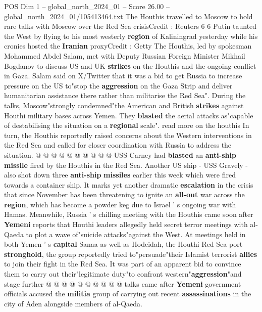 \begin{textsample}{POS Dim 1 – global\_north\_2024\_01 – Score 26.00 – global\_north\_2024\_01/105413464.txt}  \label{ex:f1_pos_129}
The Houthis travelled to Moscow to hold rare talks with Moscow over the Red Sea crisisCredit : Reuters 6 6 Putin taunted the West by flying to his most westerly \textbf{region} of Kaliningrad yesterday while his cronies hosted the \textbf{Iranian} proxyCredit : Getty The Houthis, led by spokesman Mohammed Abdel Salam, met with Deputy Russian Foreign Minister Mikhail Bogdanov to discuss US and UK \textbf{strikes} on the Houthis and the ongoing conflict in Gaza.
Salam said on X/Twitter that it was a bid to get Russia to increase pressure on the US to"stop the \textbf{aggression} on the Gaza Strip and deliver humanitarian assistance there rather than militarise the Red Sea".
During the talks, Moscow"strongly condemned"the American and British \textbf{strikes} against Houthi military bases across Yemen.
They \textbf{blasted} the aerial attacks as"capable of destabilising the situation on a \textbf{regional} scale". read more on the houthis In turn, the Houthis reportedly raised concerns about the Western interventions in the Red Sea and called for closer coordination with Russia to address the situation. @ @ @ @ @ @ @ @ @ @ USS Carney had \textbf{blasted} an \textbf{anti-ship} \textbf{missile} fired by the Houthis in the Red Sea.
Another US ship - USS Gravely - also shot down three \textbf{anti-ship} \textbf{missiles} earlier this week which were fired towards a container ship.
It marks yet another dramatic \textbf{escalation} in the crisis that since November has been threatening to ignite an \textbf{all-out} war across the \textbf{region}, which has become a powder keg due to Israel ' s ongoing war with Hamas.
Meanwhile, Russia ' s chilling meeting with the Houthis came soon after \textbf{Yemeni} reports that Houthi leaders allegedly held secret terror meetings with al-Qaeda to plot a wave of"suicide attacks"against the West.
At meetings held in both Yemen ' s \textbf{capital} Sanaa as well as Hodeidah, the Houthi Red Sea port \textbf{stronghold}, the group reportedly tried to"persuade"their Islamist terrorist \textbf{allies} to join their fight in the Red Sea.
It was part of an apparent bid to convince them to carry out their"legitimate duty"to confront western"\textbf{aggression}"and stage further @ @ @ @ @ @ @ @ @ @ talks came after \textbf{Yemeni} government officials accused the \textbf{militia} group of carrying out recent \textbf{assassinations} in the city of Aden alongside members of al-Qaeda.

\end{textsample}
